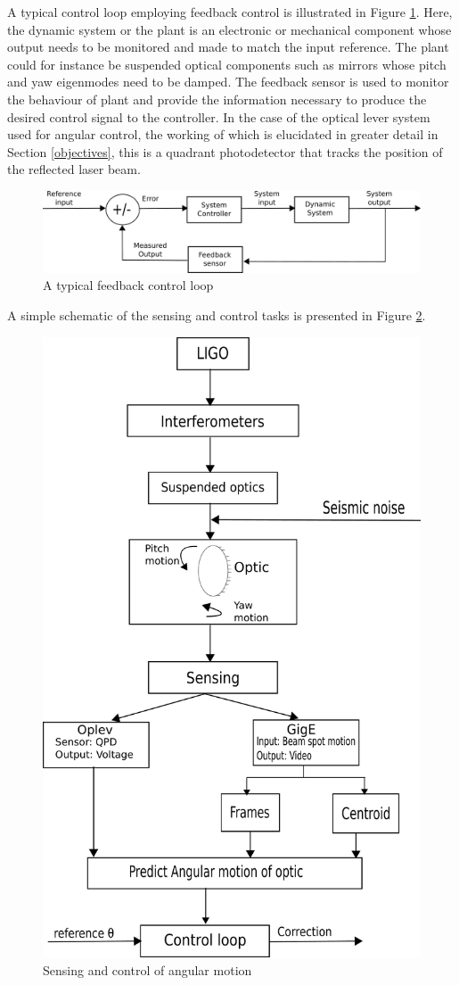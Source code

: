 \documentclass[colorlinks=true,pdfstartview=FitV,linkcolor=blue,
            citecolor=red,urlcolor=magenta]{ligodoc}
\begin{document}
A typical control loop employing feedback control is illustrated in Figure \ref{fig:control_loop_bd}. Here, the dynamic system or the plant is an electronic or mechanical component whose output needs to be monitored and made to match the input reference. The plant could for instance be suspended optical components such as mirrors whose pitch and yaw eigenmodes need to be damped. The feedback sensor is used to monitor the behaviour of plant and provide the information necessary to produce the desired control signal to the controller. In the case of the optical lever system used for angular control, the working of which is elucidated in greater detail in Section \ref{objectives}, this is a quadrant photodetector that tracks the position of the reflected laser beam. 


\begin{figure}[htbp]
\begin{center}
\includegraphics[width=.7\linewidth]{figures/control_loop_bd.pdf}
\caption{A typical feedback control loop}
\label{fig:control_loop_bd}
\end{center}
\end{figure} 

A simple schematic of the sensing and control tasks is presented in Figure \ref{fig:overall}. 

\begin{figure}[htbp]
\begin{center}
\includegraphics[width=.7\linewidth]{figures/overall.pdf}
\caption{Sensing and control of angular motion}
\label{fig:overall}
\end{center}
\end{figure} 
\end{document}
